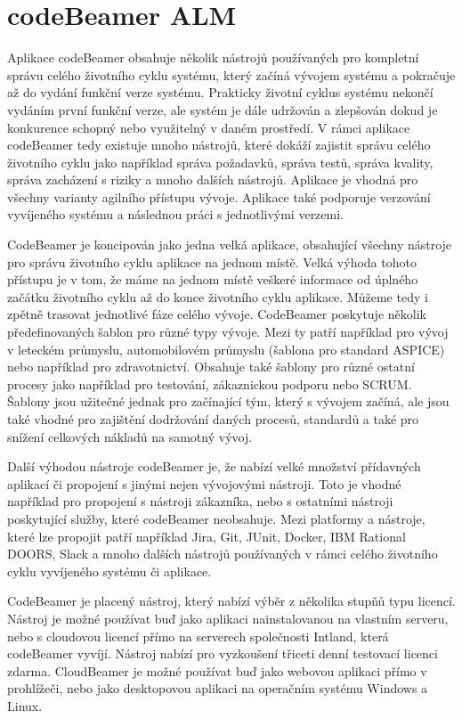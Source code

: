 \documentclass[czech,master]{diploma}
\begin{document}
\section{codeBeamer ALM}
\label{sec:codebeamer}
Aplikace codeBeamer obsahuje několik nástrojů používaných pro kompletní správu celého životního cyklu systému, který začíná vývojem systému a pokračuje až do vydání funkční verze systému. Prakticky životní cyklus systému nekončí vydáním první funkční verze, ale systém je dále udržován a zlepšován dokud je konkurence schopný nebo využitelný v daném prostředí. V rámci aplikace codeBeamer tedy existuje mnoho nástrojů, které dokáží zajistit správu celého životního cyklu jako například správa požadavků, správa testů, správa kvality, správa zacházení s riziky a mnoho dalších nástrojů. Aplikace je vhodná pro všechny varianty agilního přístupu vývoje. Aplikace také podporuje verzování vyvíjeného systému a následnou práci s jednotlivými verzemi. \cite{ref:about_codebeamer}

CodeBeamer je koncipován jako jedna velká aplikace, obsahující všechny nástroje pro správu životního cyklu aplikace na jednom místě. Velká výhoda tohoto přístupu je v tom, že máme na jednom místě veškeré informace od úplného začátku životního cyklu až do konce životního cyklu aplikace. Můžeme tedy i zpětně trasovat jednotlivé fáze celého vývoje. CodeBeamer poskytuje několik předefinovaných šablon pro různé typy vývoje. Mezi ty patří například pro vývoj v leteckém průmyslu, automobilovém průmyslu (šablona pro standard ASPICE) nebo například pro zdravotnictví. Obsahuje také šablony pro různé ostatní procesy jako například pro testování, zákaznickou podporu nebo SCRUM.  \cite{ref:codebeamer_templates} Šablony jsou užitečné jednak pro začínající tým, který s vývojem začíná, ale jsou také vhodné pro zajištění dodržování daných procesů, standardů a také pro snížení celkových nákladů na samotný vývoj.

Další výhodou nástroje codeBeamer je, že nabízí velké množství přídavných aplikací či propojení s jinými nejen vývojovými nástroji. Toto je vhodné například pro propojení s nástroji zákazníka, nebo s ostatními nástroji poskytující služby, které codeBeamer neobsahuje. Mezi platformy a nástroje, které lze propojit patří například Jira, Git, JUnit, Docker, IBM Rational DOORS, Slack a mnoho dalších nástrojů používaných v rámci celého životního cyklu vyvíjeného systému či aplikace.

CodeBeamer je placený nástroj, který nabízí výběr z několika stupňů typu licencí.  Nástroj je možné používat buď jako aplikaci nainstalovanou na vlastním serveru, nebo s cloudovou licencí přímo na serverech společnosti Intland, která codeBeamer vyvíjí. Nástroj nabízí pro vyzkoušení třiceti denní testovací licenci zdarma. CloudBeamer je možné používat buď jako webovou aplikaci přímo v prohlížeči, nebo jako desktopovou aplikaci na operačním systému Windows a Linux. \cite{ref:codebeamer_pricing}
\end{document}
